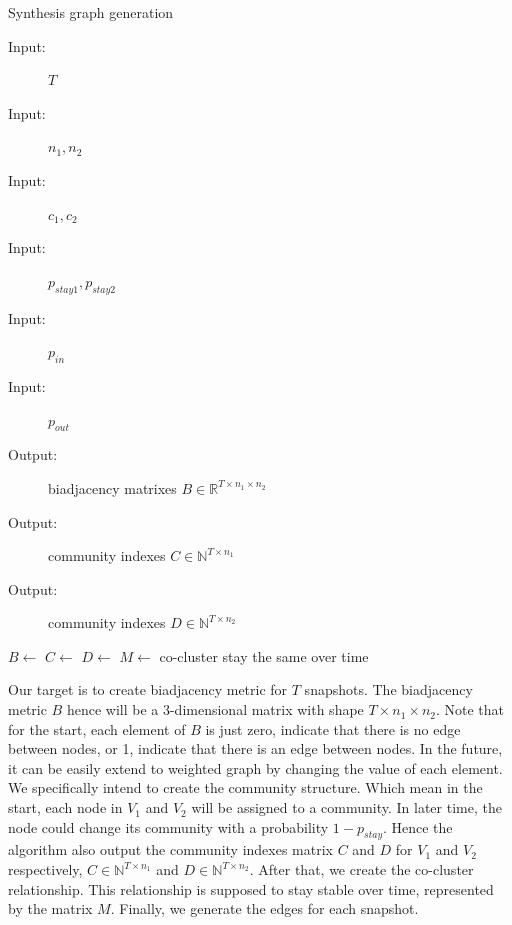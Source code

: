 \begin{algorithm}[H]
	\caption{Synthesis graph generation}
	\label{alg:synthesis_graph_all}
	\begin{description}
		\item[Input:] $T$ 
		\item[Input:] $n_1, n_2$ 
		\item[Input:] $c_1, c_2$ 
		\item[Input:] $p_{stay1}, p_{stay2}$ 
		\item[Input:] $p_{in}$ 
		\item[Input:] $p_{out}$ 
		\item[Output:] biadjacency matrixes $B \in \mathbb{R}^{T \times n_1 \times n_2}$
		\item[Output:] community indexes $C \in \mathbb{N}^{T \times n_1}$
		\item[Output:] community indexes $D \in \mathbb{N}^{T \times n_2}$
	\end{description}
	\begin{algorithmic}[1]
		\State $B \gets$ 
		\State $C \gets$ 
		\State $D \gets$ 
		\State $M \gets$ 
		\Comment co-cluster stay the same over time
		\State {}
		\EndFor
	\end{algorithmic}
\end{algorithm}

Our target is to create biadjacency metric for $T$ snapshots.
The biadjacency metric $B$ hence will be a 3-dimensional matrix with shape $T \times n_1 \times n_2$.
Note that for the start, each element of $B$ is just zero, indicate that there is no edge between nodes,
or 1, indicate that there is an edge between nodes.
In the future, it can be easily extend to weighted graph by changing the value of each element.
We specifically intend to create the community structure.
Which mean in the start, each node in $V_1$ and $V_2$ will be assigned to a community.
In later time, the node could change its community with a probability $1-p_{stay}$.
Hence the algorithm also output the community indexes matrix $C$ and $D$ for $V_1$ and $V_2$ respectively,
$C \in \mathbb{N}^{T \times n_1}$ and $D \in \mathbb{N}^{T \times n_2}$.
After that, we create the co-cluster relationship.
This relationship is supposed to stay stable over time, represented by the matrix $M$.
Finally, we generate the edges for each snapshot.

